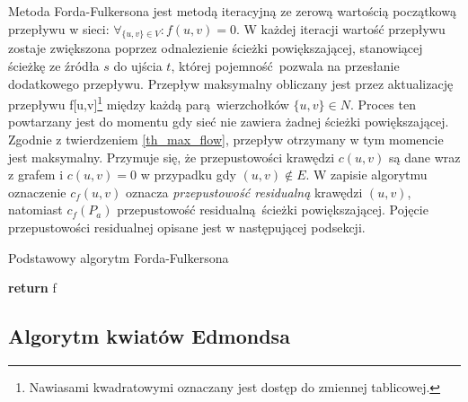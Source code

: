 \par{
  Metoda Forda-Fulkersona jest metodą iteracyjną ze zerową wartością początkową przepływu w sieci: $\forall_{\{u,v\}\in V}: f(u,v)=0$.
  W każdej iteracji wartość przepływu zostaje zwiększona poprzez odnalezienie ścieżki powiększającej, stanowiącej ścieżkę ze źródła $s$ do ujścia $t$, której pojemność pozwala na przesłanie dodatkowego przepływu.
  Przepływ maksymalny obliczany jest przez aktualizację przepływu f[u,v]\footnote{Nawiasami kwadratowymi oznaczany jest dostęp do zmiennej tablicowej.} między każdą parą wierzchołków $\{u,v\} \in N$.
  Proces ten powtarzany jest do momentu gdy sieć nie zawiera żadnej ścieżki powiększającej.
  Zgodnie z twierdzeniem \ref{th_max_flow}, przepływ otrzymany w tym momencie jest maksymalny.
  Przymuje się, że przepustowości krawędzi $c(u, v)$ są dane wraz z grafem i $c(u, v)=0$ w przypadku gdy $(u, v) \notin E$.
  W zapisie algorytmu oznaczenie $c_f(u, v)$ oznacza \emph{przepustowość residualną} krawędzi $(u, v)$, natomiast $c_f(P_a)$ przepustowość residualną ścieżki powiększającej.
  Pojęcie przepustowości residualnej opisane jest w następującej podsekcji.
  \begin{algorithm}
    \caption{Podstawowy algorytm Forda-Fulkersona}\label{alg_fordFulkerson}
    \begin{algorithmic}[1]



        \Do
        \EndFor
          \Do
            \Do
          \EndFor
        \EndWhile
        \State\textbf{return} f
      \EndFunction
  \end{algorithmic}
  \end{algorithm}
}
\subsection{Algorytm kwiatów Edmondsa}\label{ss_edmonds}




